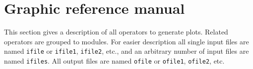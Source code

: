 \chapter{\label{refman}Graphic reference manual}

This section gives a description of all {\CDO} operators to generate plots.
Related operators are grouped to modules.
For easier description all single input files are named {\tt ifile} or {\tt ifile1}, {\tt ifile2}, etc.,
and an arbitrary number of input files are named {\tt ifiles}.
All output files are named {\tt ofile} or {\tt ofile1}, {\tt ofile2}, etc.


\hspace{3mm}



